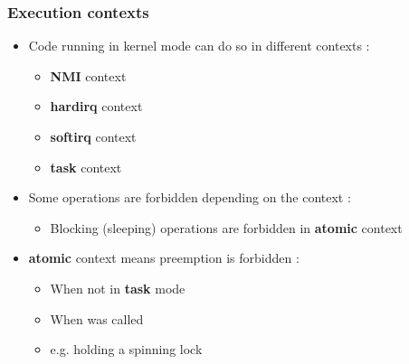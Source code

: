 \begin{frame}
	\frametitle{Execution contexts}
	\begin{itemize}
		\item Code running in kernel mode can do so in different contexts :
			\begin{itemize}
				\item \textbf{NMI} context
				\item \textbf{hardirq} context
				\item \textbf{softirq} context
				\item \textbf{task} context
			\end{itemize}
		\item Some operations are forbidden depending on the context :
			\begin{itemize}
				\item Blocking (sleeping) operations are forbidden in \textbf{atomic} context
			\end{itemize}
		\item \textbf{atomic} context means preemption is forbidden :
			\begin{itemize}
				\item When not in \textbf{task} mode
				\item When  was called
				\item e.g. holding a spinning lock
			\end{itemize}
	\end{itemize}
\end{frame}

